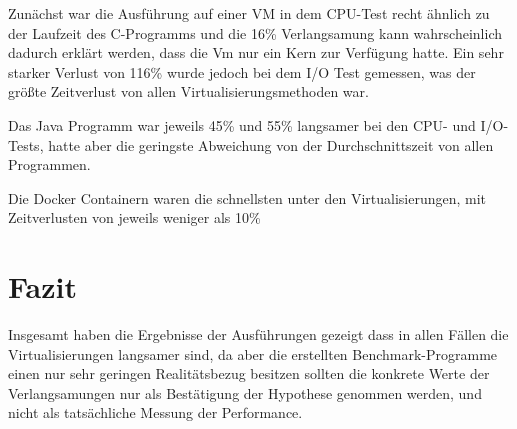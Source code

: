 \documentclass[10pt,a4paper]{article}
\begin{document}
	Zunächst war die Ausführung auf einer VM in dem CPU-Test recht ähnlich zu der Laufzeit des C-Programms und die 16\% Verlangsamung kann wahrscheinlich dadurch erklärt werden, dass die Vm nur ein Kern zur Verfügung hatte. Ein sehr starker Verlust von 116\% wurde jedoch bei dem I/O Test gemessen, was der größte Zeitverlust von allen Virtualisierungsmethoden war.
	
	Das Java Programm war jeweils 45\% und 55\% langsamer bei den CPU- und I/O-Tests, hatte aber die geringste Abweichung von der Durchschnittszeit von allen Programmen.
	
	Die Docker Containern waren die schnellsten unter den Virtualisierungen, mit Zeitverlusten von jeweils weniger als 10\%
	
	
	\section{Fazit}
	Insgesamt haben die Ergebnisse der Ausführungen gezeigt dass in allen Fällen die Virtualisierungen langsamer sind, da aber die erstellten Benchmark-Programme einen nur sehr geringen Realitätsbezug besitzen sollten die konkrete Werte der Verlangsamungen nur als Bestätigung der Hypothese genommen werden, und nicht als tatsächliche Messung der Performance.
\end{document}
